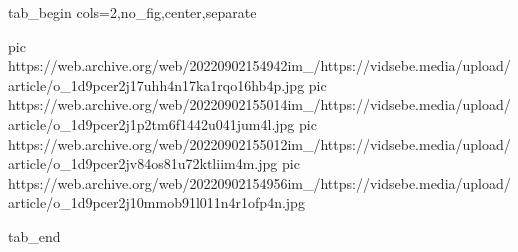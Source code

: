  
 
 
 
 

\ifcmt
  tab_begin cols=2,no_fig,center,separate

     pic https://web.archive.org/web/20220902154942im_/https://vidsebe.media/upload/article/o_1d9pcer2j17uhh4n17ka1rqo16hb4p.jpg
		 pic https://web.archive.org/web/20220902155014im_/https://vidsebe.media/upload/article/o_1d9pcer2j1p2tm6f1442u041jum4l.jpg
		 pic https://web.archive.org/web/20220902155012im_/https://vidsebe.media/upload/article/o_1d9pcer2jv84os81u72ktliim4m.jpg
		 pic https://web.archive.org/web/20220902154956im_/https://vidsebe.media/upload/article/o_1d9pcer2j10mmob91l011n4r1ofp4n.jpg

  tab_end
\fi
